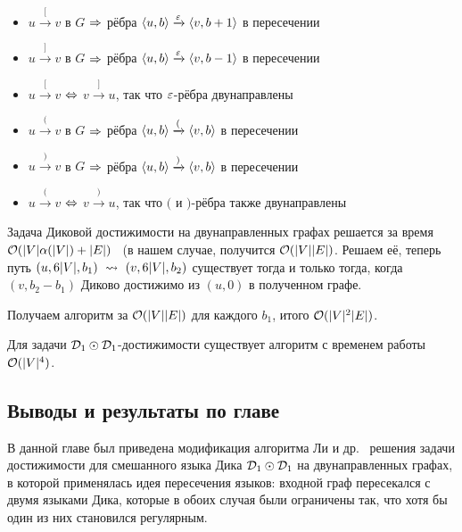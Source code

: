 \begin{enumerate}
    \vspace{-\topsep}
    \begin{itemize}
      \setlength\itemsep{-0.1em}   
      \item $u \xrightarrow{[} v$ в $G$ $\Rightarrow$ рёбра $\langle u, b \rangle \xrightarrow{\varepsilon} \langle v, b+1 \rangle$ в пересечении
      \item $u \xrightarrow{]} v$ в $G$ $\Rightarrow$ рёбра $\langle u, b \rangle \xrightarrow{\varepsilon} \langle v, b-1 \rangle$ в пересечении
      \item $u \xrightarrow{[} v$ $\Leftrightarrow$ $v \xrightarrow{]} u$, так что $\varepsilon$-рёбра двунаправлены
      \item $u \xrightarrow{(} v$ в $G$ $\Rightarrow$ рёбра $\langle u, b \rangle \xrightarrow{(} \langle v, b \rangle$ в пересечении
      \item $u \xrightarrow{)} v$ в $G$ $\Rightarrow$ рёбра $\langle u, b \rangle \xrightarrow{)} \langle v, b \rangle$ в пересечении
      \item $u \xrightarrow{(} v$ $\Leftrightarrow$ $v \xrightarrow{)} u$, так что $($ и $)$-рёбра также двунаправлены
    \end{itemize} 

    Задача Диковой достижимости на двунаправленных графах решается за время $\mathcal{O}(|V| \alpha(|V|) + |E|)$~\cite{Chatterjee17} (в нашем случае, получится $\mathcal{O}(|V||E|)$. Решаем её, теперь путь $(u, 6|V|, b_1)~\rightsquigarrow~(v, 6|V|, b_2)$ существует тогда и только тогда, когда $(v, b_2 - b_1)$ Диково достижимо из $(u, 0)$ в полученном графе.

    Получаем алгоритм за $\mathcal{O}(|V||E|)$ для каждого $b_1$, итого $\mathcal{O}(|V|^2 |E|)$.

\end{enumerate}

\begin{theorem}
  Для задачи $\mathcal{D}_1 \odot \mathcal{D}_1$-достижимости существует алгоритм с временем работы $\mathcal{O}(|V|^4)$.
\end{theorem}

\subsection{Выводы и результаты по главе}

В данной главе был приведена модификация алгоритма Ли и др.~\cite{Li21} решения задачи достижимости для смешанного языка Дика $\mathcal{D}_1 \odot \mathcal{D}_1$ на двунаправленных графах, в которой применялась идея пересечения языков: входной граф пересекался с двумя языками Дика, которые в обоих случая были ограничены так, что хотя бы один из них становился регулярным.


